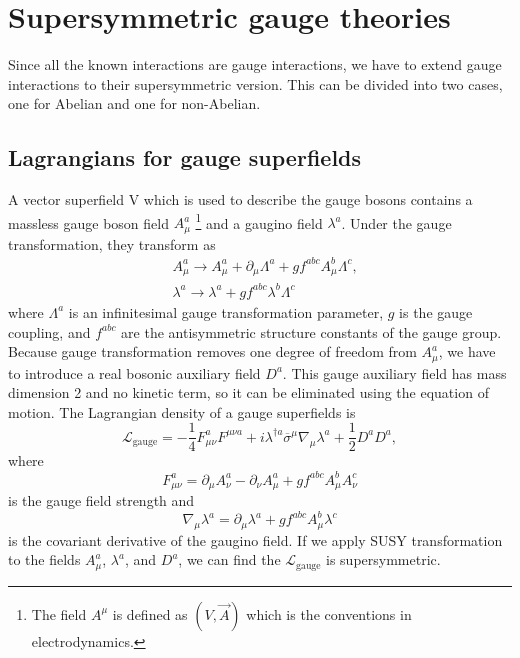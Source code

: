 \documentclass[12pt]{report}
\begin{document}
\chapter{Supersymmetric gauge theories}

Since all the known interactions are gauge interactions, we have to extend gauge interactions to their supersymmetric version.
This can be divided into two cases, one for Abelian and one for non-Abelian.



\section{Lagrangians for gauge superfields}
A vector superfield V which is used to describe the gauge bosons contains a massless gauge boson field $A^{a}_{\mu}$ \footnote{The field $A^{\mu}$ is defined as $(V, \vec{A})$ which is the conventions in electrodynamics.} and a gaugino field $\lambda^{a}$.
Under the gauge transformation, they transform as
\begin{align}
& A^{a}_{\mu} \to A^{a}_{\mu} + \partial_{\mu} \Lambda^{a} + g f^{abc} A^{b}_{\mu} \Lambda^{c} ,\\
& \lambda^{a} \to \lambda^{a} + g f^{abc} \lambda^{b} \Lambda^{c}
\end{align}
where $\Lambda^{a}$ is an infinitesimal gauge transformation parameter, $g$ is the gauge coupling, and $f^{abc}$ are the antisymmetric structure constants of the gauge group.
Because gauge transformation removes one degree of freedom from $A^{a}_{\mu}$, we have to introduce a real bosonic auxiliary field $D^{a}$.
This gauge auxiliary field has mass dimension 2 and no kinetic term, so it can be eliminated using the equation of motion.
The Lagrangian density of a gauge superfields is
\begin{equation} \label{eq: L_gauge}
\mathcal{L}_{\mathrm{gauge}} = - \frac{1}{4} F^{a}_{\mu \nu} F^{\mu \nu a} + i \lambda^{\dag a} \overline{\sigma}^{\mu} \nabla_{\mu} \lambda^{a} + \frac{1}{2} D^{a} D^{a} ,
\end{equation}
where
\begin{equation} \label{eq: gauge field strength}
F^{a}_{\mu \nu} = \partial_{\mu} A^{a}_{\nu} - \partial_{\nu} A^{a}_{\mu} + g f^{abc} A^{b}_{\mu} A^{c}_{\nu}
\end{equation}
is the gauge field strength and
\begin{equation}
\nabla_{\mu} \lambda^{a} = \partial_{\mu} \lambda^{a} + g f^{abc} A^{b}_{\mu} \lambda^{c}
\end{equation}
is the covariant derivative of the gaugino field.
If we apply SUSY transformation to the fields $A^{a}_{\mu}$, $\lambda^{a}$, and $D^{a}$, we can find the $\mathcal{L}_{\mathrm{gauge}}$ is supersymmetric.
\end{document}

